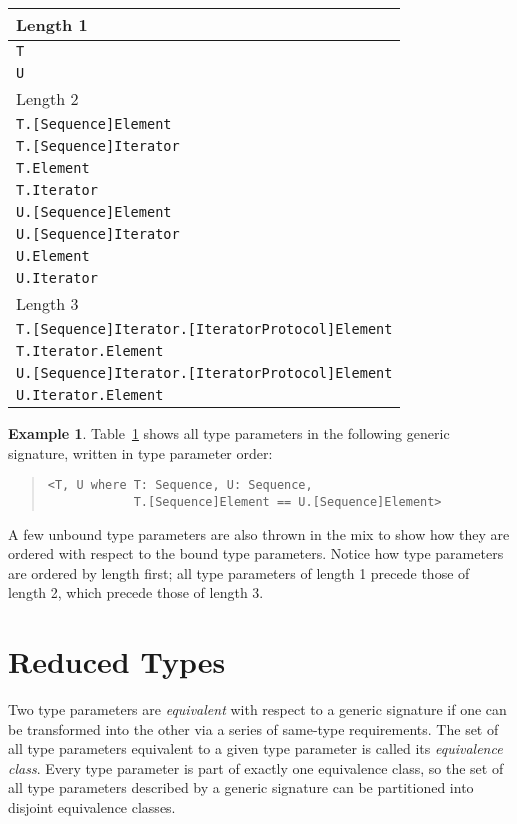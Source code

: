 \documentclass[a4paper,headsepline,bibliography=totoc,toc=flat,fleqn,twoside=semi]{scrbook}
\theoremstyle{definition}
\theoremstyle{definition}
\newtheorem{example}{Example}[chapter]
\theoremstyle{definition}
\begin{document}
\begin{table}\label{typeparameterordertable}
\begin{tabular}{|l|}
\hline
Length 1\\
\hline
\texttt{T}\\
\texttt{U}\\
\hline
\hline
Length 2\\
\hline
\texttt{T.[Sequence]Element}\\
\texttt{T.[Sequence]Iterator}\\
\texttt{T.Element}\\
\texttt{T.Iterator}\\
\texttt{U.[Sequence]Element}\\
\texttt{U.[Sequence]Iterator}\\
\texttt{U.Element}\\
\texttt{U.Iterator}\\
\hline
\hline
Length 3\\
\hline
\texttt{T.[Sequence]Iterator.[IteratorProtocol]Element}\\
\texttt{T.Iterator.Element}\\
\texttt{U.[Sequence]Iterator.[IteratorProtocol]Element}\\
\texttt{U.Iterator.Element}\\
\hline
\end{tabular}
\end{table}

\begin{example}\label{typeparameterorderexample} Table~\ref{typeparameterordertable} shows all type parameters in the following generic signature, written in type parameter order:
\begin{quote}
\begin{verbatim}
<T, U where T: Sequence, U: Sequence,
            T.[Sequence]Element == U.[Sequence]Element>
\end{verbatim}
\end{quote}
A few unbound type parameters are also thrown in the mix to show how they are ordered with respect to the bound type parameters.
Notice how type parameters are ordered by length first; all type parameters of length 1 precede those of length 2, which precede those of length 3.
\end{example}

\section{Reduced Types}\label{reducedtypes}
Two type parameters are \emph{equivalent} with respect to a generic signature if one can be transformed into the other via a series of same-type requirements. The set of all type parameters equivalent to a given type parameter is called its \emph{equivalence class}. Every type parameter is part of exactly one equivalence class, so the set of all type parameters described by a generic signature can be partitioned into disjoint equivalence classes.
\end{document}
